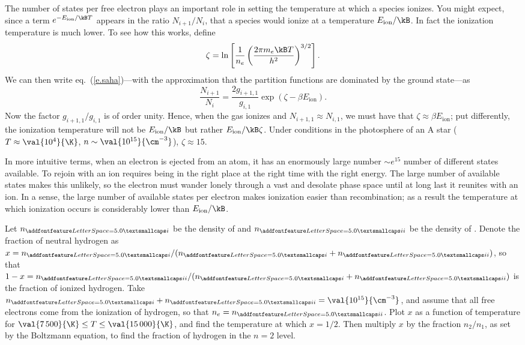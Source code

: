 The number of states per free electron plays an important role in setting the temperature at which a species ionizes. You might expect, since a term $e^{-E_{\mathrm{ion}}/\kB T}$ appears in the ratio $N_{i+1}/N_{i}$, that a species would ionize at a temperature $E_{\mathrm{ion}}/\kB$. In fact the ionization temperature is much lower. To see how this works, define
\[
	\zeta = \ln\left[\frac{1}{n_{e}}\left(\frac{2\pi m_{e}\kB T}{h^{2}}\right)^{3/2}\right].
\]
We can then write eq.~(\ref{e.saha})---with the approximation that the partition functions are dominated by the ground state---as
\[
	\frac{N_{i+1}}{N_{i}} = \frac{2g_{i+1,1}}{g_{i,1}}\exp\left(\zeta - \beta E_{\mathrm{ion}}\right).
\]
Now the factor $g_{i+1,1}/g_{i,1}$ is of order unity. Hence, when the gas ionizes and $N_{i+1,1}\approx N_{i,1}$, we must have that $\zeta\approx \beta E_{\mathrm{ion}}$; put differently, the ionization temperature will not be $E_{\mathrm{ion}}/\kB$ but rather $E_{\mathrm{ion}}/\kB\zeta$. Under conditions in the photosphere of an A star ($T \approx \val{10^{4}}{\K}$, $n\sim \val{10^{15}}{\cm^{-3}}$), $\zeta \approx 15$.

In more intuitive terms, when an electron is ejected from an atom, it has an enormously large number $\sim e^{15}$ number of different states available. To rejoin with an ion requires being in the right place at the right time with the right energy. The large number of available states makes this unlikely, so the electron must wander lonely through a vast and desolate phase space until at long last it reunites with an ion. In a sense, the large number of available states per electron makes ionization easier than recombination; as a result the temperature at which ionization occurs is considerably lower than $E_{\mathrm{ion}}/\kB$.

\begin{exercisebox}
\label{ex.strong-Balmer}
Let $n_{\textsc{i}}$ be the density of  and $n_{\textsc{ii}}$ be the density of . Denote the fraction of neutral hydrogen as $x = n_{\textsc{i}}/(n_{\textsc{i}}+n_{\textsc{ii}})$, so that $1-x = n_{\textsc{ii}}/(n_{\textsc{i}}+n_{\textsc{ii}})$ is the fraction of ionized hydrogen. Take $n_{\textsc{i}}+n_{\textsc{ii}} = \val{10^{15}}{\cm^{-3}}$, and assume that all free electrons come from the ionization of hydrogen, so that $n_{e} = n_{\textsc{ii}}$. Plot $x$ as a function of temperature for $\val{7\,500}{\K}\le T\le \val{15\,000}{\K}$, and find the temperature at which $x = 1/2$. Then multiply $x$ by the fraction $n_{2}/n_{1}$, as set by the Boltzmann equation, to find the fraction of hydrogen in the $n=2$ level.
\end{exercisebox}

